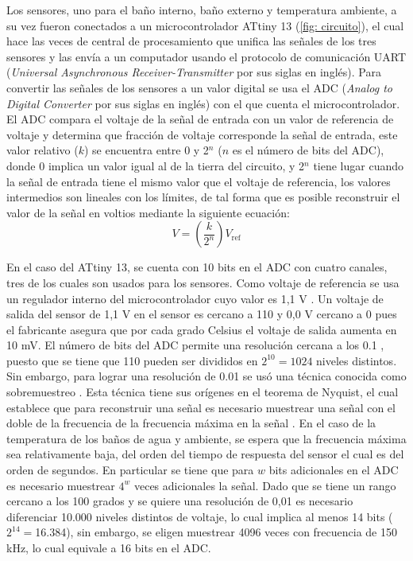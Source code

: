 	Los sensores, uno para el baño interno, baño externo y temperatura ambiente, a su vez fueron conectados a un microcontrolador ATtiny 13 \cite{attiny13} (\autoref{fig: circuito}), el cual hace las veces de central de procesamiento que unifica las señales de los tres sensores y las envía a un computador usando el protocolo de comunicación UART (\textit{Universal Asynchronous Receiver-Transmitter} por sus siglas en inglés). Para convertir las señales de los sensores a un valor digital se usa el ADC (\textit{Analog to Digital Converter} por sus siglas en inglés) con el que cuenta el microcontrolador. El ADC compara el voltaje de la señal de entrada con un valor de referencia de voltaje y determina que fracción de voltaje corresponde la señal de entrada, este valor relativo ($k$) se encuentra entre 0 y 2$^{n}$ ($n$ es el número de bits del ADC), donde 0 implica un valor igual al de la tierra del circuito, y 2$^n$ tiene lugar cuando la señal de entrada tiene el mismo valor que el voltaje de referencia, los valores intermedios son lineales con los límites, de tal forma que es posible reconstruir el valor de la señal en voltios mediante la siguiente ecuación:
	\begin{equation}
		V = \left(\dfrac{k}{2^n}\right)V_{\text{ref}}
	\end{equation}
	
	En el caso del ATtiny 13, se cuenta con 10 bits en el ADC con cuatro canales, tres de los cuales son usados para los sensores. Como voltaje de referencia se usa un regulador interno del microcontrolador cuyo valor es 1,1 V \cite{attiny13}. Un voltaje de salida del sensor de 1,1 V en el sensor es cercano a 110 \grad{} y 0,0 V cercano a 0 \grad{} pues el fabricante asegura que por cada grado Celsius el voltaje de salida aumenta en 10 mV. El número de bits del ADC permite una resolución cercana a los 0.1 \grad{}, puesto que se tiene que 110 \grad{} pueden ser divididos en $2^{10} = 1024$ niveles distintos. Sin embargo, para lograr una resolución de 0.01 \grad{} se usó una técnica conocida como sobremuestreo \cite{grewal2006oversampling}. Esta técnica tiene sus orígenes en el teorema de Nyquist, el cual establece que para reconstruir una señal es necesario muestrear una señal con el doble de la frecuencia de la frecuencia máxima en la señal \cite{alexander2009fundamentals}. En el caso de la temperatura de los baños de agua y ambiente, se espera que la frecuencia máxima sea relativamente baja, del orden del tiempo de respuesta del sensor el cual es del orden de segundos. En particular se tiene que para $w$ bits adicionales en el ADC es necesario muestrear $4^w$ veces adicionales la señal. Dado que se tiene un rango cercano a los 100 grados y se quiere una resolución de 0,01 \grad{} es necesario diferenciar 10.000 niveles distintos de voltaje, lo cual implica al menos 14 bits ($2^{14}=$16.384), sin embargo, se eligen muestrear 4096 veces con frecuencia de 150 kHz, lo cual equivale a 16 bits en el ADC.
	
